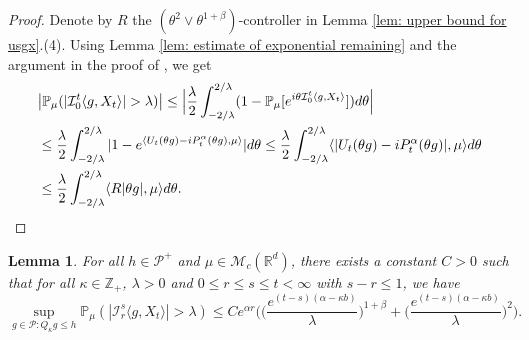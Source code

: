 \documentclass[12pt,a4paper]{amsart}
\theoremstyle{plain}
\newtheorem{lem}[thm]{Lemma}
\theoremstyle{definition}
\numberwithin{equation}{section}
\begin{document}
\begin{proof}
    Denote by $R$ the $(\theta^2\vee\theta^{1+\beta})$-controller in Lemma \ref{lem: upper bound for usgx}.(4).
    Using Lemma \ref{lem: estimate of exponential remaining} and the argument in the proof of \cite[Theorem 3.3.6]{Durrett2010Probability}, we get
\begin{equation}\begin{split}
    &\big|\mathbb P_\mu (|\mathcal{I}_0^t\langle g,X_t\rangle| > \lambda)\big|
    \leq \Big|\frac{\lambda}{2}\int_{-2/\lambda}^{2/\lambda}(1 - \mathbb P_\mu[e^{i\theta \mathcal{I}_0^t\langle g,X_t\rangle}])d\theta\Big|
    \\&\leq \frac{\lambda}{2}\int_{-2/\lambda}^{2/\lambda}|1-e^{\langle U_t(\theta g)-iP^\alpha_t (\theta g),\mu \rangle}|d\theta
    \leq \frac{\lambda}{2}\int_{-2/\lambda}^{2/\lambda}\langle |U_t(\theta g) - iP^\alpha_t(\theta g)|,\mu\rangle d\theta
    \\&\leq \frac{\lambda}{2}\int_{-2/\lambda}^{2/\lambda}\langle R|\theta g|,\mu\rangle d\theta.
      \qedhere
\end{split}\end{equation}
\end{proof}
\begin{lem}\label{lem: temp}
    For all $h \in \mathcal P^+$ and $\mu \in \mathcal M_c(\mathbb R^d)$, there exists a constant $C > 0$ such that 
    for all $\kappa \in \mathbb Z_+ $, $\lambda > 0$ and $0\leq r\leq s\leq t<\infty$ with $s-r \leq 1$, we have
\[
    \sup_{g \in \mathcal P: Q_\kappa g\leq h}\mathbb P_{\mu}(|\mathcal I_r^s\langle g, X_t\rangle|>\lambda)
    \leq C e^{\alpha r} \bigg(\Big( \frac{e^{(t-s)(\alpha - \kappa b)}}{\lambda}\Big)^{1+\beta} + \Big( \frac{e^{(t-s)(\alpha - \kappa b)}}{\lambda}\Big)^{2} \bigg).
\]
\end{lem}
\end{document}
